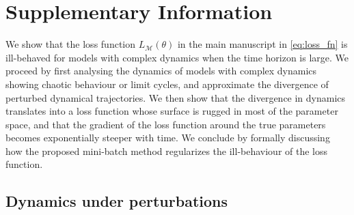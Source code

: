 \newcommand{\perr}{|\nicefrac{(\hat p -\Tilde{p})}{\Tilde{p}}|}
\newcommand{\by}{\textbf{y}}
\newcommand{\AIC}{\text{AIC}}
\newcommand{\M}{\mathcal{M}}

\graphicspath{{./content/chap3_mini-batching/}}

\setcounter{equation}{0}
\setcounter{figure}{0}
\setcounter{table}{0}
\makeatletter %
\renewcommand{\thetable}{S\arabic{table}}
\renewcommand{\theequation}{S\arabic{equation}}
\renewcommand{\thefigure}{S\arabic{figure}}
\makeatother %

\section{Supplementary Information}
\label{secSI:supmat}

We show that the loss function $L_\M(\theta)$ in the main manuscript in \cref{eq:loss_fn} is ill-behaved for models with complex dynamics when the time horizon is large. We proceed by first analysing the dynamics of models with complex dynamics showing chaotic behaviour or limit cycles, and approximate the divergence of perturbed dynamical trajectories. We then show that the divergence in dynamics translates into a loss function whose surface is rugged in most of the parameter space, and that the gradient of the loss function around the true parameters becomes exponentially steeper with time. We conclude by formally discussing how the proposed mini-batch method regularizes the ill-behaviour of the loss function.

\subsection{Dynamics under perturbations}

